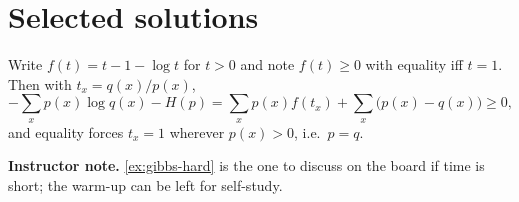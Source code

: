 \documentclass[11pt]{article}
\begin{document}
\section*{Selected solutions}

\begin{solution}
Write $f(t) = t - 1 - \log t$ for $t > 0$ and note $f(t) \geq 0$ with equality
iff $t = 1$. Then with $t_x = q(x)/p(x)$,
\[ -\sum_x p(x) \log q(x) - H(p) = \sum_x p(x) f\!\left(t_x\right) +
   \sum_x \bigl(p(x) - q(x)\bigr) \geq 0, \]
and equality forces $t_x = 1$ wherever $p(x) > 0$, i.e.\ $p = q$.
\end{solution}

\begin{solutionsonly}
\textbf{Instructor note.} \cref{ex:gibbs-hard} is the one to discuss on
the board if time is short; the warm-up can be left for self-study.
\end{solutionsonly}



\end{document}
